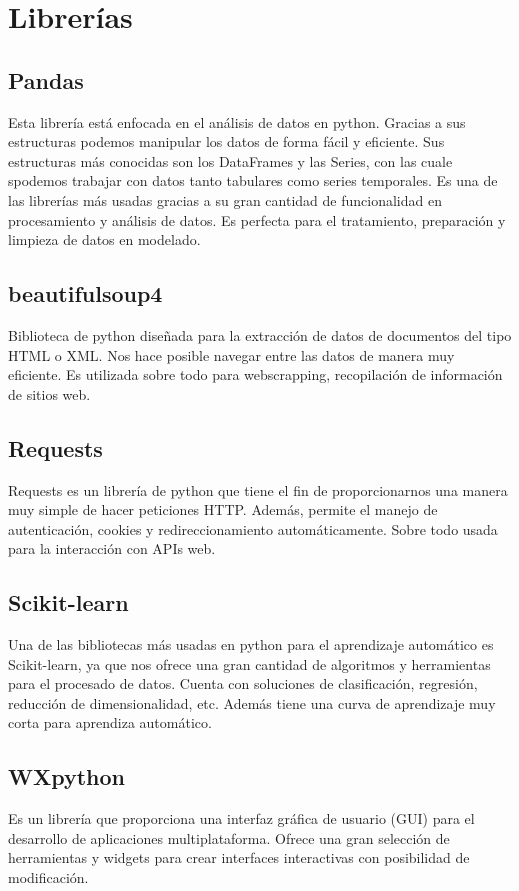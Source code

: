 \section{Librerías}

\subsection{Pandas}
Esta librería está enfocada en el análisis de datos en python. Gracias a sus estructuras podemos manipular los datos de forma fácil y eficiente. Sus estructuras más conocidas son los DataFrames y las Series, con las cuale spodemos trabajar con datos tanto tabulares como series temporales. Es una de las librerías más usadas gracias a su gran cantidad de funcionalidad en procesamiento y análisis de datos. Es perfecta para el tratamiento, preparación y limpieza de datos en modelado.

\subsection{beautifulsoup4}
Biblioteca de python diseñada para la extracción de datos de documentos del tipo HTML o XML. Nos hace posible navegar entre las datos de manera muy eficiente. Es utilizada sobre todo para webscrapping, recopilación de información de sitios web. 


\subsection{Requests}
Requests es un librería de python que tiene el fin de proporcionarnos una manera muy simple de hacer peticiones HTTP. Además, permite el manejo de autenticación, cookies y redireccionamiento automáticamente. Sobre todo usada para la interacción con APIs web.

\subsection{Scikit-learn}
Una de las bibliotecas más usadas en python para el aprendizaje automático es Scikit-learn, ya que nos ofrece una gran cantidad de algoritmos y herramientas para el procesado de datos. Cuenta con soluciones de clasificación, regresión, reducción de dimensionalidad, etc. Además tiene una curva de aprendizaje muy corta para aprendiza automático.

\subsection{WXpython}
Es un librería que proporciona una interfaz gráfica de usuario (GUI) para el desarrollo de aplicaciones multiplataforma. Ofrece una gran selección de herramientas y widgets para crear interfaces interactivas con posibilidad de modificación.


